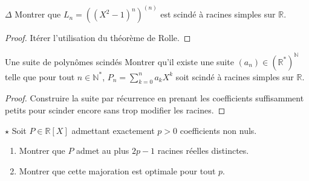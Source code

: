 \documentclass[french,a4paper]{article}
\newcommand{\N}{\mathbb{N}}
\newcommand{\R}{\mathbb{R}}
\newcommand{\st}{^*}
\theoremstyle{plain}
\theoremstyle{definition}
\theoremstyle{remark}
\begin{document}
\begin{ex}{$\Delta$}
	Montrer que $L_n=\left((X^2-1)^n\right)^{(n)}$ est scindé à racines simples sur $\R$.
\end{ex}
\begin{proof}
	Itérer l'utilisation du théorème de Rolle.
\end{proof}

\begin{ex}{Une suite de polynômes scindés}
	Montrer qu'il existe une suite $(a_n)\in(\R\st)^\N$ telle que pour tout $n\in\N\st$, $P_n=\displaystyle\sum_{k=0}^{n}a_kX^k$ soit scindé à racines simples sur $\R$.
\end{ex}
\begin{proof}
	Construire la suite par récurrence en prenant les coefficients suffisamment petits pour scinder encore sans trop modifier les racines.
\end{proof}

\begin{ex}{$\star$}
	Soit $P\in\R[X]$ admettant exactement $p>0$ coefficients non nuls.
	\begin{enumerate}
		\item Montrer que $P$ admet au plus $2p-1$ racines réelles distinctes.
		\item Montrer que cette majoration est optimale pour tout $p$.
	\end{enumerate}
\end{ex}
\end{document}
